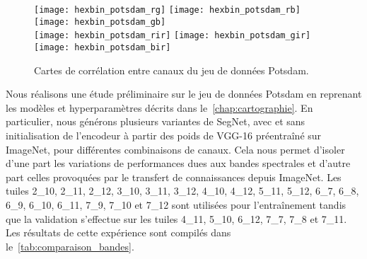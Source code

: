 \begin{figure}[h]
  \texttt{[image: hexbin\_potsdam\_rg]}
  \texttt{[image: hexbin\_potsdam\_rb]}
  \texttt{[image: hexbin\_potsdam\_gb]}\\
  \texttt{[image: hexbin\_potsdam\_rir]}
  \texttt{[image: hexbin\_potsdam\_gir]}
  \texttt{[image: hexbin\_potsdam\_bir]}
  \caption{Cartes de corrélation entre canaux du jeu de données  Potsdam.}
  \label{fig:potsdam_correlations}
\end{figure}

Nous réalisons une étude préliminaire sur le jeu de données  Potsdam en reprenant les modèles et hyperparamètres décrits dans le~\cref{chap:cartographie}. En particulier, nous générons plusieurs variantes de \gls{SegNet}, avec et sans initialisation de l'encodeur à partir des poids de VGG-16 préentraîné sur ImageNet, pour différentes combinaisons de canaux. Cela nous permet d'isoler d'une part les variations de performances dues aux bandes spectrales et d'autre part celles provoquées par le transfert de connaissances depuis ImageNet. Les tuiles 2\_10, 2\_11, 2\_12, 3\_10, 3\_11, 3\_12, 4\_10, 4\_12, 5\_11, 5\_12, 6\_7, 6\_8, 6\_9, 6\_10, 6\_11, 7\_9, 7\_10 et 7\_12 sont utilisées pour l'entraînement tandis que la validation s'effectue sur les tuiles 4\_11, 5\_10, 6\_12, 7\_7, 7\_8 et 7\_11. Les résultats de cette expérience sont compilés dans le~\cref{tab:comparaison_bandes}.

